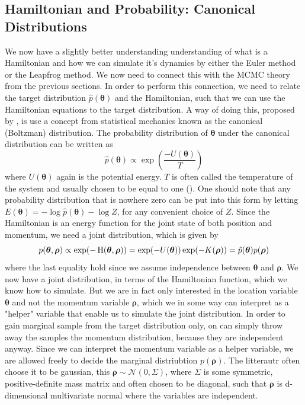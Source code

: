 \subsection{Hamiltonian and Probability: Canonical Distributions}
We now have a slightly better understanding understanding of what is a Hamiltonian and how we can simulate it's dynamics by either the Euler method or the Leapfrog method. We now need to connect this with the MCMC theory from the previous sections. In order to perform this connection, we need to relate the target distribution $\hat{p}(\boldsymbol{\theta})$ and the Hamiltonian, such that we can use the Hamiltonian equations to the target distribution. A way of doing this, proposed by \cite{neal2012bayesian}, is use a concept from statistical mechanics known as the canonical (Boltzman) distribution. The probability distribution of $\boldsymbol{\theta}$ under the canonical distribution can be written as
\begin{equation*}
    \hat{p}(\boldsymbol{\theta})\propto \exp(\frac{-U(\boldsymbol{\theta})}{T})
\end{equation*}
where $U(\boldsymbol{\theta})$ again is the potential energy. $T$ is often called the temperature of the system and usually chosen to be equal to one (\cite{neal2012bayesian}).
One should note that any probability distribution that is nowhere zero can be put into this form by letting $E(\boldsymbol{\theta})=-\log \hat{p}(\boldsymbol{\theta})-\log Z$, for any convenient choice of $Z$.  Since the Hamiltonian is an energy function for the joint state of both position and momentum, we need a joint distribution, which is given by
\begin{equation*}
p(\boldsymbol{\theta},\boldsymbol{\rho})\propto \exp(-\operatorname{H}(\boldsymbol{\theta},\boldsymbol{\rho}))   = \exp(-U(\boldsymbol{\theta}))\exp(-K(\boldsymbol{\rho}))=\hat{p}(\boldsymbol{\theta})p(\boldsymbol{\rho})
\end{equation*}
where the last equality hold since we assume independence between $\boldsymbol{\theta}$ and $\boldsymbol{\rho}$. We now have a joint distribution, in terms of the Hamiltonian function, which we know how to simulate. But we are in fact only interested in the location variable $\boldsymbol{\theta}$ and not the momentum variable $\boldsymbol{\rho}$, which we in some way can interpret as a "helper" variable that enable us to simulate the joint distribution. In order to gain marginal sample from the target distribution only, on can simply throw away the samples the momentum distribution, because they are independent anyway. Since we can interpret the momentum variable as a  helper variable, we are allowed freely to decide the marginal distriubtion $p(\boldsymbol{\rho})$. The litterautr often choose it to be gaussian, this $\boldsymbol{\rho}\sim \mathcal{N}\left(0, \Sigma \right)$, where $\Sigma$ is some symmetric, positive-definite mass matrix and often chosen to be diagonal, such that $\boldsymbol{\rho}$ is d-dimensional multivariate normal where the variables are independent. 
